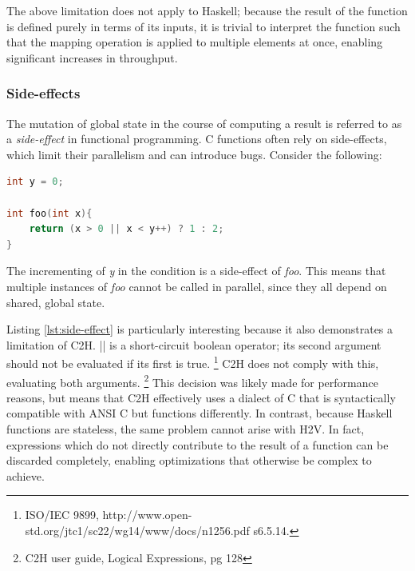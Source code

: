 \documentclass[english,onecolumn]{article}
\begin{document}
The above limitation does not apply to Haskell; because the result of the function is defined purely in terms of its inputs, it is trivial to interpret the function such that the mapping operation is applied to multiple elements at once, enabling significant increases in throughput.


\subsubsection{Side-effects}
The mutation of global state in the course of computing a result is referred to as a \textit{side-effect} in functional programming. C functions often rely on side-effects, which limit their parallelism and can introduce bugs. Consider the following:
\begin{lstlisting}[language=C, label={lst:side-effect}]
int y = 0;

int foo(int x){
    return (x > 0 || x < y++) ? 1 : 2;
}
\end{lstlisting}

The incrementing of \textit{y} in the condition is a side-effect of \textit{foo}. This means that multiple instances of \textit{foo} cannot be called in parallel, since they all depend on shared, global state.

Listing \ref{lst:side-effect} is particularly interesting because it also demonstrates a limitation of C2H. || is a short-circuit boolean operator; its second argument should not be evaluated if its first is true.%
\footnote{ISO/IEC 9899, http://www.open-std.org/jtc1/sc22/wg14/www/docs/n1256.pdf s6.5.14.}
C2H does not comply with this, evaluating both arguments.%
\footnote{C2H user guide, Logical Expressions, pg 128}
This decision was likely made for performance reasons, but means that C2H effectively uses a dialect of C that is syntactically compatible with ANSI C but functions differently.
In contrast, because Haskell functions are stateless, the same problem cannot arise with H2V. In fact, expressions which do not directly contribute to the result of a function can be discarded completely, enabling optimizations that otherwise be complex to achieve.
\end{document}
